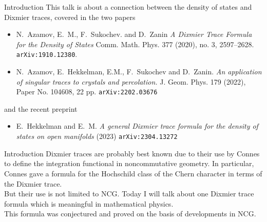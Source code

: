 \documentclass{beamer}
\numberwithin{equation}{section}
\theoremstyle{plain}
\theoremstyle{plain}
\theoremstyle{definition}
\theoremstyle{plain}
\theoremstyle{plain}
\theoremstyle{definition}
\newcommand{\tr}{{\rm Tr}}
\newcommand{\Vol}{\mathrm{Vol}}
\newcommand{\Rl}{\mathbb{R}}
\begin{document}
\begin{frame}{Introduction}
This talk is about a connection between the density of states and Dixmier traces, covered in the two papers
\begin{itemize}
\item{} N.~Azamov, E.~M., F.~Sukochev. and D.~Zanin \emph{A Dixmier Trace Formula for the Density of States} Comm. Math. Phys. 377 (2020), no. 3, 2597–2628.  \texttt{arXiv:1910.12380}.
\item{} N.~Azamov, E.~Hekkelman, E.M., F.~Sukochev and D.~Zanin. \emph{An application of singular traces to crystals and percolation.} J. Geom. Phys. 179 (2022), Paper No. 104608, 22 pp. \texttt{arXiv:2202.03676}
\end{itemize}
and the recent preprint
\begin{itemize}
\item{} E.~Hekkelman and E.~M. \emph{A general Dixmier trace formula for the density of states on open manifolds} (2023) \texttt{arXiv:2304.13272}
\end{itemize}

% 
% 
% 

% 

\end{frame}

\begin{frame}{Introduction}
    Dixmier traces are probably best known due to their use by Connes to define the integration functional
    in noncommutative geometry. In particular, Connes gave a formula for the Hochschild class of the Chern character in terms of the Dixmier trace. \\ 
    \pause
    But their use is not limited to NCG. Today I will talk about one Dixmier trace formula which is meaningful in mathematical physics. \\
    \pause
    This formula was conjectured and proved on the basis of developments in NCG.
\end{frame}
\end{document}
